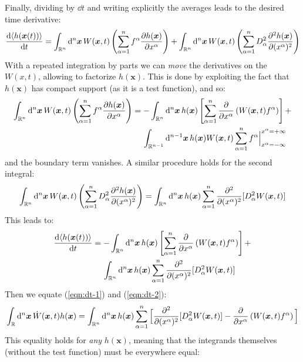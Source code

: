 \documentclass[../template.tex]{subfiles}
\begin{document}
\begin{exo}
Finally, dividing by $\dd{t}$ and writing explicitly the averages leads to the desired time derivative:
\begin{align*}
    \dv{\langle h(\bm{x}(t)) \rangle}{t} =  \int_{\mathbb{R}^n} \dd[n]{\bm{x}} 
    W(\bm{x},t) \left(\sum_{\alpha=1}^n f^\alpha \pdv{h(\bm{x})}{x^\alpha}\right) + \int_{\mathbb{R}^n} \dd[n]{\bm{x}} W(\bm{x},t) \left(\sum_{\alpha=1}^n D_\alpha^2 \pdv[2]{h(\bm{x})}{(x^\alpha)}
    \right )
\end{align*}
With a repeated integration by parts we can \textit{move} the derivatives on the $W(x,t)$, allowing to factorize $h(\bm{x})$. This is done by exploiting the fact that $h(\bm{x})$ has compact support (as it is a test function), and so:
\begin{align*}
    \int_{\mathbb{R}^n} \dd[n]{\bm{x}} W(\bm{x},t) \left(\sum_{\alpha=1}^n f^\alpha \pdv{h(\bm{x})}{x^\alpha}\right) &= -\int_{\mathbb{R}^n} \dd[n]{\bm{x}} h(\bm{x})\left[ \sum_{\alpha=1}^n \pdv{x^\alpha}\left(W(\bm{x},t) f^\alpha\right) \right] +\\
    &\quad \> \int_{\mathbb{R}^{n-1}} \dd[n-1]{\bm{x}} h(\bm{x}) W(\bm{x},t) \sum_{\alpha=1}^n f^\alpha \Big|_{x^\alpha = -\infty}^{x^\alpha = +\infty}
\end{align*}
and the boundary term vanishes. A similar procedure holds for the second integral:
\begin{align*}
    \int_{\mathbb{R}^n} \dd[n]{\bm{x}} W(\bm{x},t) \left(\sum_{\alpha=1}^n D_\alpha^2 \pdv[2]{h(\bm{x})}{(x^\alpha)} 
    \right ) = \int_{\mathbb{R}^n} \dd[n]{\bm{x}} h(\bm{x}) \sum_{\alpha=1}^n \pdv[2]{(x^\alpha)}[D_\alpha^2 W(\bm{x},t)]
\end{align*}
This leads to:
\begin{align} \nonumber
    \dv{\langle h(\bm{x}(t)) \rangle}{t} &= -\int_{\mathbb{R}^n} \dd[n]{\bm{x}} h(\bm{x})\left[ \sum_{\alpha=1}^n \pdv{x^\alpha}\left(W(\bm{x},t) f^\alpha\right) \right]  +\\
    &\quad \> \int_{\mathbb{R}^n} \dd[n]{\bm{x}} h(\bm{x}) \sum_{\alpha=1}^n \pdv[2]{(x^\alpha)}[D_\alpha^2 W(\bm{x},t)]\label{eqn:dt-2}
\end{align}
Then we equate (\ref{eqn:dt-1}) and (\ref{eqn:dt-2}):
\begin{align*}
    \int_{\mathbb{R}} \dd[n]{\bm{x}} \dot{W}(\bm{x},t) h(\bm{x}) = \int_{\mathbb{R}^n} \dd[n]{\bm{x}} h(\bm{x}) \sum_{\alpha=1}^n \Big[\pdv[2]{(x^\alpha)}[D_\alpha^2 W(\bm{x},t)] -  \pdv{x^\alpha}\left(W(\bm{x},t) f^\alpha\right)\Big]
\end{align*}
This equality holds for \textit{any} $h(\bm{x})$, meaning that the integrands themselves (without the test function) must be everywhere equal:

\end{exo}
\end{document}

